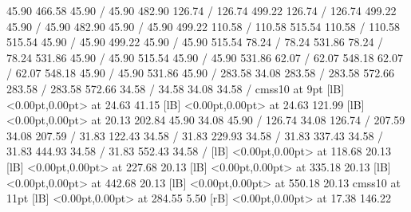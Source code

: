 { 45.90 466.58 45.90 /
\setsolid
{} 45.90 482.90 126.74 /
 126.74 499.22 126.74 /
 126.74 499.22 45.90 /
 45.90 482.90 45.90 /
\setsolid
{} 45.90 499.22 110.58 /
 110.58 515.54 110.58 /
 110.58 515.54 45.90 /
 45.90 499.22 45.90 /
\setsolid
{} 45.90 515.54 78.24 /
 78.24 531.86 78.24 /
 78.24 531.86 45.90 /
 45.90 515.54 45.90 /
\setsolid
{} 45.90 531.86 62.07 /
 62.07 548.18 62.07 /
 62.07 548.18 45.90 /
 45.90 531.86 45.90 /
\setsolid
{} 283.58 34.08 283.58 /
 283.58 572.66 283.58 /
 283.58 572.66 34.58 /
 34.58 34.08 34.58 /
\font\picfont cmss10 at 9pt\picfont
{}  [lB] <0.00pt,0.00pt> at 24.63 41.15
  [lB] <0.00pt,0.00pt> at 24.63 121.99
  [lB] <0.00pt,0.00pt> at 20.13 202.84
\setsolid
{} 45.90 34.08 45.90 /
\setsolid
{} 126.74 34.08 126.74 /
\setsolid
{} 207.59 34.08 207.59 /
\setsolid
{} 31.83 122.43 34.58 /
\setsolid
{} 31.83 229.93 34.58 /
\setsolid
{} 31.83 337.43 34.58 /
\setsolid
{} 31.83 444.93 34.58 /
\setsolid
{} 31.83 552.43 34.58 /
  [lB] <0.00pt,0.00pt> at 118.68 20.13
  [lB] <0.00pt,0.00pt> at 227.68 20.13
  [lB] <0.00pt,0.00pt> at 335.18 20.13
  [lB] <0.00pt,0.00pt> at 442.68 20.13
  [lB] <0.00pt,0.00pt> at 550.18 20.13
\font\picfont cmss10 at 11pt\picfont
{}  [lB] <0.00pt,0.00pt> at 284.55 5.50
 [rB] <0.00pt,0.00pt> at 17.38 146.22
\endpicture
}
